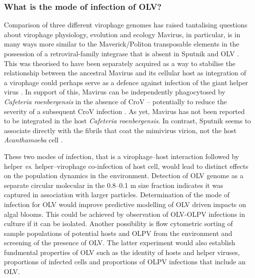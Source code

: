 \subsubsection{What is the mode of infection of \ac{OLV}?}
Comparison of three different virophage genomes has raised tantalising questions about virophage physiology, evolution and ecology
Mavirus, in particular, is in many ways more similar to the Maverick/Politon transposable elements in the possession of a retroviral-family integrase that is absent in Sputnik and \ac{OLV} \cite{Fischer2011}.
This was theorised to have been separately acquired as a way to stabilise the relationship between the ancestral Mavirus and its cellular host as integration of a virophage could perhaps serve as a defence against infection of the giant helper virus \cite{Fischer2011}.
In support of this, Mavirus can be independently phagocytosed by \emph{Cafeteria roenbergensis} in the absence of \ac{CroV} -- potentially to reduce the severity of a subsequent \ac{CroV} infection \cite{Fischer2011}.
As yet, Mavirus has not been reported to be integrated in the host \emph{Cafeteria roenbergensis}.
In contrast, Sputnik seems to associate directly with the fibrils that coat the mimivirus virion, not the host \emph{Acanthamoeba} cell \cite{Boyer2011}.

These two modes of infection, that is a virophage--host interaction followed by helper \emph{vs}. helper--virophage co-infection of host cell, would lead to distinct effects on the population dynamics in the environment.
Detection of \ac{OLV} genome as a separate circular molecular in the 0.8--0.1 \textmu{}m size fraction indicates it was captured in association with larger particles.
Determination of the mode of infection for \ac{OLV} would improve predictive modelling of \ac{OLV} driven impacts on algal blooms.
This could be achieved by observation of \ac{OLV}-\ac{OLPV} infections in culture if it can be isolated.
Another possibility is flow cytometric sorting of sample populations of potential hosts and \ac{OLPV} from the environment and screening of the presence of \ac{OLV}.
The latter experiment would also establish fundmental properties of \ac{OLV} such as the identity of hosts and helper viruses, proportions of infected cells and proportions of \ac{OLPV} infections that include an \ac{OLV}.

